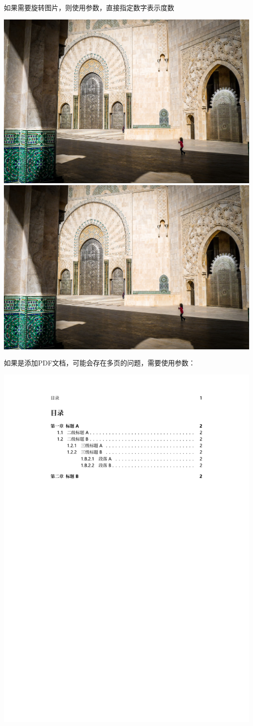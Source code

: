     如果需要旋转图片，则使用参数，直接指定数字表示度数
    \begin{texshow}
        \includegraphics[width=0.3\columnwidth,angle=45]
                        {contents/fig/mosque.jpg}
        \includegraphics[width=0.3\columnwidth,angle=-45]
                        {contents/fig/mosque.jpg}
    \end{texshow}

    如果是添加PDF文档，可能会存在多页的问题，需要使用参数：

    \begin{texshow}
        \includegraphics[page=2,height=0.4\textheight]
                        {./contents/fig/section-depth.pdf}
    \end{texshow}

